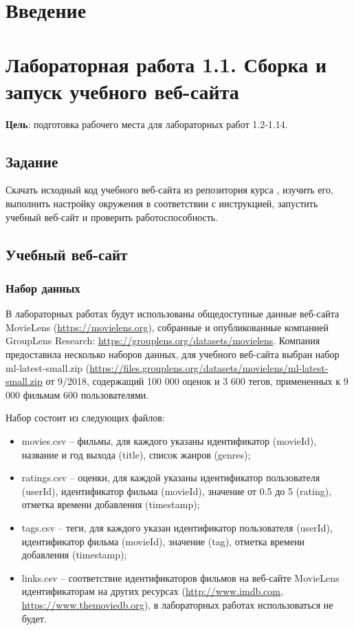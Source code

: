 \documentclass[a4paper,12pt]{report} %
\begin{document}
	\tableofcontents %
	
	\chapter* {Введение}
	\chapter {Лабораторная работа 1.1. Сборка и запуск учебного веб-сайта}
	\textbf{Цель}: подготовка рабочего места для лабораторных работ 1.2-1.14.
	
	
	\section{Задание}
	Скачать исходный код учебного веб-сайта из репозитория курса \url{}, изучить его, выполнить настройку окружения в соответствии с инструкцией, запустить учебный веб-сайт и проверить работоспособность.
	\section{Учебный веб-сайт}
	\subsection{Набор данных}
	В лабораторных работах будут использованы общедоступные данные веб-сайта MovieLens (\url{https://movielens.org}), собранные и опубликованные компанией GroupLens Research: \url{https://grouplens.org/datasets/movielens}. Компания предоставила несколько наборов данных, для учебного веб-сайта выбран набор ml-latest-small.zip (\url{https://files.grouplens.org/datasets/movielens/ml-latest-small.zip} от 9/2018, содержащий 100 000 оценок и 3 600 тегов, примененных к 9 000 фильмам 600 пользователями.
	
	Набор состоит из следующих файлов:
	\begin{itemize}
		\item movies.csv -- фильмы, для каждого указаны идентификатор (movieId), название и год выхода (title), список жанров (genres);
		\item ratings.csv -- оценки, для каждой указаны идентификатор пользователя (userId), идентификатор фильма (movieId), значение от 0.5 до 5 (rating), отметка времени добавления (timestamp);
		\item tags.csv -- теги, для каждого указан идентификатор пользователя (userId), идентификатор фильма (movieId), значение (tag), отметка времени добавления (timestamp);
		\item links.csv -- соответствие идентификаторов фильмов на веб-сайте MovieLens идентификаторам на других ресурсах (\url{http://www.imdb.com}, \url{https://www.themoviedb.org}), в лабораторных работах использоваться не будет.
    \end{itemize}
\end{document}
